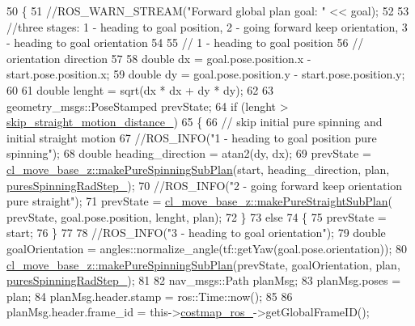 \begin{DoxyCode}
50 \{
51     \textcolor{comment}{//ROS\_WARN\_STREAM("Forward global plan goal: " << goal);}
52 
53     \textcolor{comment}{//three stages: 1 - heading to goal position, 2 - going forward keep orientation, 3 - heading to goal
       orientation}
54 
55     \textcolor{comment}{// 1 - heading to goal position}
56     \textcolor{comment}{// orientation direction}
57 
58     \textcolor{keywordtype}{double} dx = goal.pose.position.x - start.pose.position.x;
59     \textcolor{keywordtype}{double} dy = goal.pose.position.y - start.pose.position.y;
60 
61     \textcolor{keywordtype}{double} lenght = sqrt(dx * dx + dy * dy);
62 
63     geometry\_msgs::PoseStamped prevState;
64     \textcolor{keywordflow}{if} (lenght > \hyperlink{classcl__move__base__z_1_1forward__global__planner_1_1ForwardGlobalPlanner_abafd101fa62caf2d74f118a0b4bb948c}{skip\_straight\_motion\_distance\_})
65     \{
66         \textcolor{comment}{// skip initial pure spinning and initial straight motion}
67         \textcolor{comment}{//ROS\_INFO("1 - heading to goal position pure spinning");}
68         \textcolor{keywordtype}{double} heading\_direction = atan2(dy, dx);
69         prevState = \hyperlink{namespacecl__move__base__z_ac774e138510eb7b5e0015be1f7709e19}{cl\_move\_base\_z::makePureSpinningSubPlan}(start, 
      heading\_direction, plan, \hyperlink{classcl__move__base__z_1_1forward__global__planner_1_1ForwardGlobalPlanner_a6aed6f8f6e57a8c5821977814d0b9402}{puresSpinningRadStep\_});
70         \textcolor{comment}{//ROS\_INFO("2 - going forward keep orientation pure straight");}
71         prevState = \hyperlink{namespacecl__move__base__z_a1d6998cc28a1847906272f2bf92bacc8}{cl\_move\_base\_z::makePureStraightSubPlan}(
      prevState, goal.pose.position, lenght, plan);
72     \}
73     \textcolor{keywordflow}{else}
74     \{
75         prevState = start;
76     \}
77 
78     \textcolor{comment}{//ROS\_INFO("3 - heading to goal orientation");}
79     \textcolor{keywordtype}{double} goalOrientation = angles::normalize\_angle(tf::getYaw(goal.pose.orientation));
80     \hyperlink{namespacecl__move__base__z_ac774e138510eb7b5e0015be1f7709e19}{cl\_move\_base\_z::makePureSpinningSubPlan}(prevState, 
      goalOrientation, plan, \hyperlink{classcl__move__base__z_1_1forward__global__planner_1_1ForwardGlobalPlanner_a6aed6f8f6e57a8c5821977814d0b9402}{puresSpinningRadStep\_});
81 
82     nav\_msgs::Path planMsg;
83     planMsg.poses = plan;
84     planMsg.header.stamp = ros::Time::now();
85     
86     planMsg.header.frame\_id = this->\hyperlink{classcl__move__base__z_1_1forward__global__planner_1_1ForwardGlobalPlanner_a711d4a0d92a216eb8cab3b42f18eb795}{costmap\_ros\_}->getGlobalFrameID();

\end{DoxyCode}
